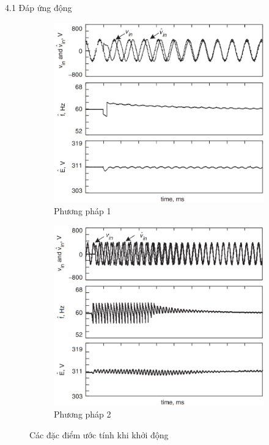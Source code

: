 \documentclass[11pt]{beamer}
\begin{document}
\begin{frame}[t]{4.1 Đáp ứng động}
	  \begin{figure}
		\begin{subfigure}{0.5\textwidth}
			\includegraphics[width=\linewidth]{fig12a}
			\caption{Phương pháp 1}
		\end{subfigure}%
		\begin{subfigure}{0.5\textwidth}
			\includegraphics[width=\linewidth]{fig12b}
			\caption{Phương pháp 2}
		\end{subfigure}
		\caption{Các đặc điểm ước tính khi khởi động}
	\end{figure}	
	
\end{frame}
\end{document}
